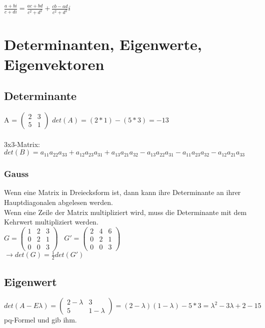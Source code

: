 \documentclass[a4paper,landscape, 11pt]{article}
\begin{document}
\begin{multicols}{4}
\begin{small}
        $\displaystyle \frac{a + bi}{c + di} = \frac{ac + bd}{c^2 + d^2} + \frac{cb - ad}{c^2 + d^2}i$
    
    \section{Determinanten, Eigenwerte, Eigenvektoren}
        \subsection{Determinante}
        A = $\left(
        \begin{matrix}
            2 & 3 \\
            5 & 1
        \end{matrix}
        \right)$ \hspace{2pt} 
        $det(A) = (2*1) - (5*3) = -13$ \\ \\
        3x3-Matrix:\\
        $det(B) = a_{11} a_{22} a_{33} + a_{12} a_{23} a_{31} + a_{13} a_{21} a_{32} - a_{13} a_{22} a_{31} - a_{11} a_{23} a_{32} - a_{12} a_{21} a_{33}$  
        
        \subsubsection{Gauss}
        Wenn eine Matrix in Dreiecksform ist, dann kann ihre Determinante an ihrer Hauptdiagonalen abgelesen werden. \\
        Wenn eine Zeile der Matrix multipliziert wird, muss die Determinante mit dem Kehrwert multipliziert werden.\\
        
        $G = \begin{pmatrix}
            1 & 2 & 3 \\
            0 & 2 & 1 \\
            0 & 0 & 3
        \end{pmatrix}
        \hspace{10pt}
        G' = \begin{pmatrix}
        
        2 & 4 & 6 \\
        0 & 2 & 1 \\
        0 & 0 & 3
        \end{pmatrix}
        $
        \\
        $\rightarrow det(G) = \frac{1}{2} det(G')$
        \subsection{Eigenwert}
        $det(A - E\lambda) = 
        \left(
        \begin{matrix}
            2-\lambda & 3 \\
            5 & 1-\lambda
        \end{matrix}
        \right) = (2-\lambda)(1-\lambda) - 5*3 = \lambda^2 - 3\lambda  + 2 - 15$\\
        pq-Formel und gib ihm. 
        

\end{small}
\end{multicols}
\end{document}
